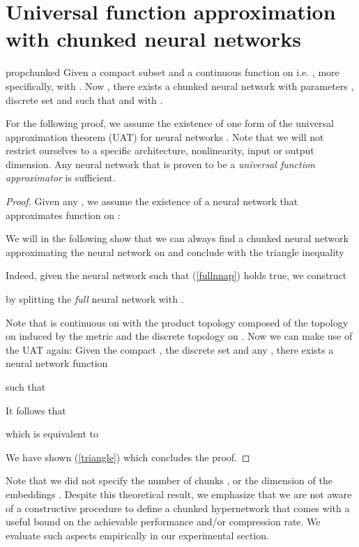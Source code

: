 \documentclass{article}
\begin{document}
\section{Universal function approximation with chunked neural networks}
\label{apx:proof-chunks}

\begin{restatable}{prop}{chunked}
  \label{theoremchunks}
  Given a compact subset  and a continuous function on  i.e. , more specifically,  with . Now , there exists a chunked neural network  with parameters , discrete set  and  such that  and with .
\end{restatable}
For the following proof, we assume the existence of one form of the universal approximation theorem (UAT) for neural networks \citep{leshno_multilayer_1993,hanin_universal_2017}.
Note that we will not restrict ourselves to a specific architecture, nonlinearity, input or output dimension. Any neural network that is proven to be a \textit{universal function approximator} is sufficient. 


  
  \begin{proof}
  Given any , we assume the existence of a neural network  that approximates function  on :
  
  
  
  We will in the following show that we can always find a chunked neural network 
  approximating the neural network  on  and conclude with the triangle inequality 
  
  
  


  Indeed, given the neural network   such that (\ref{fullnnap}) holds true, we construct 
  
  
  
  by splitting the \textit{full} neural network 
   with . 
  
  
  Note that  is continuous on  with the product topology composed of the topology on  induced by the metric  and the discrete topology on .
  Now we can make use of the UAT again: Given the compact , the discrete set  and any , there exists a neural network function 
  
  such that 
  
  
  
  It follows that
  
  
  
  which is equivalent to
  
  
  
  We have shown (\ref{triangle}) which concludes the proof.
  \end{proof}
Note that we did not specify the number of chunks ,  or the dimension  of the embeddings . Despite this theoretical result, we emphasize that we are not aware of a constructive procedure to define a chunked hypernetwork that comes with a useful bound on the achievable performance and/or compression rate. We evaluate such aspects empirically in our experimental section.
\end{document}
